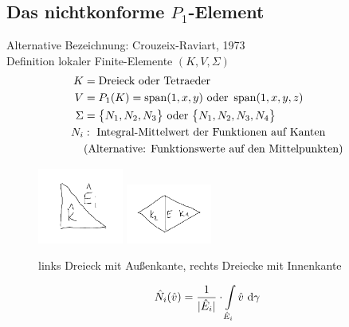 \subsection{Das nichtkonforme \texorpdfstring{$P_1$}{P\_1}-Element}
Alternative Bezeichnung: Crouzeix-Raviart, 1973\\
Definition lokaler Finite-Elemente $(K,V,\Sigma)$
\begin{align*}
K&=\text{Dreieck oder Tetraeder}\\
V&=P_1(K)=\operatorname{span}(1,x,y)\text{ oder }\operatorname{span}(1,x,y,z)\\
\Sigma&=\big\lbrace N_1,N_2,N_3\big\rbrace\text{ oder }\big\lbrace N_1,N_2,N_3,N_4\big\rbrace\\
N_i&:\text{ Integral-Mittelwert der Funktionen auf Kanten}\\
&\text{(Alternative: Funktionswerte auf den Mittelpunkten)}
\end{align*}

\begin{beisp}\enter
\begin{figure}[!ht]
	\begin{center}
		\includegraphics[width=0.25\textwidth]{pics/Sketch6.png}
		\includegraphics[width=0.25\textwidth]{pics/Sketch7.png}
		\caption{links Dreieck mit Außenkante, rechts Dreiecke mit Innenkante}
		\label{AbbKantentypen}
	\end{center}
\end{figure}
\begin{align*}
\hat{N}_i(\hat{v})=\frac{1}{|\hat{E}_i|}\cdot\int\limits_{\hat{E}_i}\hat{v}\text{ d}\gamma
\end{align*}
\end{beisp}

